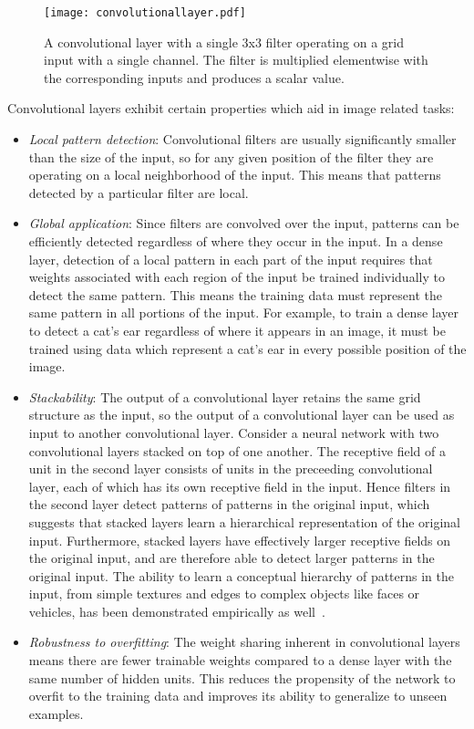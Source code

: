 
\begin{figure}
	\centering
	\texttt{[image: convolutionallayer.pdf]}
	\caption{A convolutional layer with a single 3x3 filter operating on a grid input with a single channel. The filter is multiplied elementwise with the corresponding inputs and produces a scalar value.}
	\label{fig:convolutionallayer}
\end{figure}


Convolutional layers exhibit certain properties which aid in image related tasks:
\begin{itemize}
\item
\textit{Local pattern detection}: Convolutional filters are usually significantly smaller than the size of the input, so for any given position of the filter they are operating on a local neighborhood of the input. 
This means that patterns detected by a particular filter are local.
\item
\textit{Global application}: Since filters are convolved over the input, patterns can be efficiently detected regardless of where they occur in the input.
In a dense layer, detection of a local pattern in each part of the input requires that weights associated with each region of the input be trained individually to detect the same pattern.
This means the training data must represent the same pattern in all portions of the input. 
For example, to train a dense layer to detect a cat's ear regardless of where it appears in an image, it must be trained using data which represent a cat's ear in every possible position of the image.
\item
\textit{Stackability}: The output of a convolutional layer retains the same grid structure as the input, so the output of a convolutional layer can be used as input to another convolutional layer.
Consider a neural network with two convolutional layers stacked on top of one another.
The receptive field of a unit in the second layer consists of units in the preceeding convolutional layer, each of which has its own receptive field in the input.
Hence filters in the second layer detect patterns of patterns in the original input, which suggests that stacked layers learn a hierarchical representation of the original input.
Furthermore, stacked layers have effectively larger receptive fields on the original input, and are therefore able to detect larger patterns in the original input.
The ability to learn a conceptual hierarchy of patterns in the input, from simple textures and edges to complex objects like faces or vehicles, has been demonstrated empirically as well~\cite{zeiler2013}.
\item
\textit{Robustness to overfitting}: The weight sharing inherent in convolutional layers means there are fewer trainable weights compared to a dense layer with the same number of hidden units. 
This reduces the propensity of the network to overfit to the training data and improves its ability to generalize to unseen examples.
\end{itemize}

